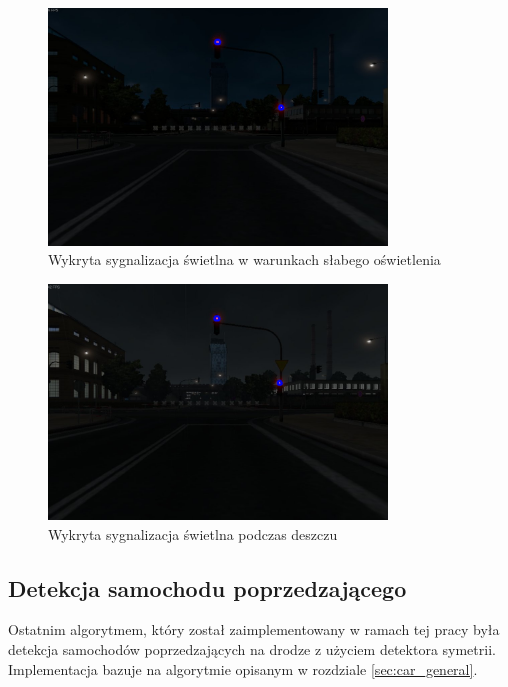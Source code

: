 \begin{figure}
  \centering
  \includegraphics[width=9cm]{img/alg2_late.jpg}
  \caption{Wykryta sygnalizacja świetlna w warunkach słabego oświetlenia}
  \label{fig:alg2_late}
\end{figure}

\begin{figure}
  \centering
  \includegraphics[width=9cm]{img/alg2_rain.jpg}
  \caption{Wykryta sygnalizacja świetlna podczas deszczu} %
  \label{fig:alg2_rain}
\end{figure}


\subsection{Detekcja samochodu poprzedzającego}
Ostatnim algorytmem, który został zaimplementowany w ramach tej pracy była detekcja samochodów poprzedzających na drodze z użyciem detektora symetrii. 
Implementacja bazuje na algorytmie opisanym w rozdziale \ref{sec:car_general}. %

